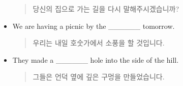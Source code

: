 \documentclass{article}
\begin{document}
\begin{addmargin}[1em]{1em}
\begin{itemize}
    \begin{quote}
    당신의 집으로 가는 길을 다시 말해주시겠습니까?
    \end{quote}
    \item We are having a picnic by the \_\_\_\_\_\_ tomorrow.
    \begin{quote}
    우리는 내일 호숫가에서 소풍을 할 것입니다.
    \end{quote}
    \item They made a \_\_\_\_\_\_ hole into the side of the hill.
    \begin{quote}
    그들은 언덕 옆에 깊은 구멍을 만들었습니다.
    \end{quote}
\end{itemize}
\end{addmargin}
\end{document}
